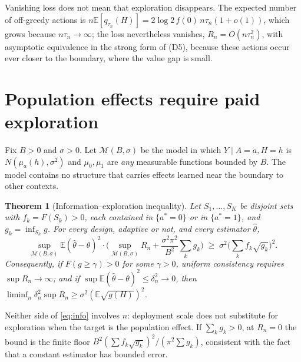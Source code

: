 \documentclass[12pt]{article}
\newtheorem{theorem}{Theorem}
\theoremstyle{definition}
\theoremstyle{remark}
\newcommand{\E}{\mathbb{E}}
\newcommand{\M}{\mathcal{M}}
\begin{document}
Vanishing loss does not mean that exploration disappears. The expected number
of off-greedy actions is $n\E[q_{\tau_n}(H)]=2\log2\,f(0)\,n\tau_n(1+o(1))$,
which grows because $n\tau_n\to\infty$; the loss nevertheless vanishes,
$R_n=O(n\tau_n^2)$, with asymptotic equivalence in the strong form of
(D5), because these actions occur ever closer to the boundary,
where the value gap is small.

\section{Population effects require paid exploration}\label{sec:population}

Fix $B>0$ and $\sigma>0$. Let $\M(B,\sigma)$ be the model in which $Y\mid A=a,H=h$ is $N(\mu_a(h),\sigma^2)$
and $\mu_0,\mu_1$ are \emph{any} measurable functions bounded by $B$. The
model contains no structure that carries effects learned near the boundary to
other contexts.

\begin{theorem}[Information--exploration inequality]\label{thm:info}
Let $S_1,\dots,S_K$ be disjoint sets with $f_k=F(S_k)>0$, each contained in
$\{a^*=0\}$ or in $\{a^*=1\}$, and $g_k=\inf_{S_k}g$. For every design,
adaptive or not, and every estimator $\hat\theta$,
\begin{equation}\label{eq:info}
\sup_{\M(B,\sigma)}\E(\hat\theta-\theta)^2\cdot
\Big(\sup_{\M(B,\sigma)}R_n+\frac{\sigma^2\pi^2}{B^2}\sum_k g_k\Big)
\;\ge\;\sigma^2\Big(\sum_kf_k\sqrt{g_k}\Big)^2 .
\end{equation}
Consequently, if $F(g\ge\gamma)>0$ for some $\gamma>0$, uniform consistency
requires $\sup R_n\to\infty$; and if $\sup\E(\hat\theta-\theta)^2\le\delta_n^2\to0$,
then $\liminf_n\delta_n^2\sup R_n\ge\sigma^2(\E\sqrt{g(H)})^2$.
\end{theorem}

Neither side of \eqref{eq:info} involves $n$: deployment scale does not
substitute for exploration when the target is the population effect. If
$\sum_k g_k>0$, at $R_n=0$ the bound is the finite floor
$B^2(\sum f_k\sqrt{g_k})^2/(\pi^2\sum g_k)$, consistent with the fact that a
constant estimator has bounded error.
\end{document}
